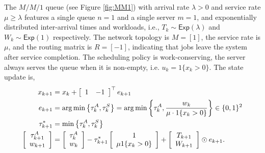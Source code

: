 \begin{example}
\label{example:mm1}
The $M/M/1$ queue (see Figure \ref{fig:MM1}) with arrival rate $\lambda>0$ and
service rate $\mu\geq\lambda$ features a single queue $n=1$ and a single server $m=1$, and exponentially distributed inter-arrival times and workloads, i.e., $T_k \sim \mathsf{Exp}\left(\lambda\right)$ and
$W_k \sim \mathsf{Exp}(1)$ respectively. The network topology is $M=[1]$, the service rate is $\mu$, and the routing matrix is $R =[-1]$, indicating that jobs leave the system after service completion.
The scheduling policy is work-conserving, the server always serves the queue when it is non-empty, i.e. $u_{k}=1\{x_{k}>0\}$. The state update is,
\begin{align*}
 x_{k+1}  &=x_{k}+\left[\begin{array}{cc}
1 & -1
\end{array}\right]^{\top}e_{k+1}\\
e_{k+1} 
&=\arg\min\left\{ \tau_{k}^{A},\tau_{k}^{S} \right\} =\arg\min\left\{ \tau_{k}^{A},\frac{w_{k}}{\mu \cdot 1\{x_{k}>0 \}} \right\} \in \{0,1\}^{2} \\
\tau^{*}_{k+1} &= \min\left\{ \tau_{k}^{A},\tau_{k}^{S} \right\} \\
\left[
\begin{array}{c}
\tau_{k+1}^{A} \\
w_{k+1}
\end{array}
\right]
&= 
\left[
\begin{array}{c}
\tau_{k}^{A} \\
w_{k}
\end{array}
\right]
- \tau_{k+1}^{*}\left[
\begin{array}{c}
1 \\
\mu 1\{ x_{k} > 0\}
\end{array}
\right] +
\left[
\begin{array}{c}
T_{k+1} \\
W_{k+1}
\end{array}
\right] \odot e_{k+1}.
\end{align*}
\end{example}



